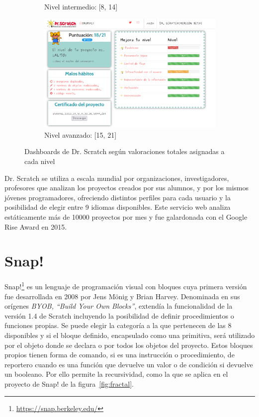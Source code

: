 \documentclass[a4paper, 12pt]{book}
\begin{document}
\begin{figure}[H]
\begin{subfigure}[h]{.325\textwidth}
        \caption{Nivel intermedio: [8, 14]}
    \end{subfigure}
    \begin{subfigure}[h]{.325\textwidth} 
        \includegraphics[width=\textwidth]{img/alto_Scratch}
        \caption{Nivel avanzado: [15, 21]}
    \end{subfigure}
    \caption{Dashboards de Dr. Scratch según valoraciones totales asignadas a cada nivel}
    \label{fig:dashboards}
\end{figure}

Dr. Scratch se utiliza a escala mundial por organizaciones, investigadores, profesores que analizan los proyectos creados por sus alumnos, y por los mismos jóvenes programadores, ofreciendo distintos perfiles para cada usuario y la posibilidad de elegir entre 9 idiomas disponibles. Este servicio web analiza estáticamente más de 10000 proyectos por mes y fue galardonada con el Google Rise Award en 2015. %

\section{Snap!}
\label{sec:snap}

Snap!\footnote{\url{https://snap.berkeley.edu/}} es un lenguaje de programación visual con bloques cuya primera versión fue desarrollada en 2008 por Jens Mönig y Brian Harvey. Denominada en sus orígenes \emph{BYOB, ``Build Your Own Blocks''}, extendía la funcionalidad de la versión 1.4 de Scratch incluyendo la posibilidad de definir procedimientos o funciones propias. Se puede elegir la categoría a la que pertenecen de las 8 disponibles y si el bloque definido, encapsulado como una primitiva, será utilizado por el objeto donde se declara o por todos los objetos del proyecto. %
Estos bloques propios tienen forma de comando, si es una instrucción o procedimiento, de reportero cuando es una función que devuelve un valor o de condición si devuelve un booleano. Por ello permite la recursividad, como la que se aplica en el proyecto de Snap! de la figura~\ref{fig:fractal}. %
\end{document}
